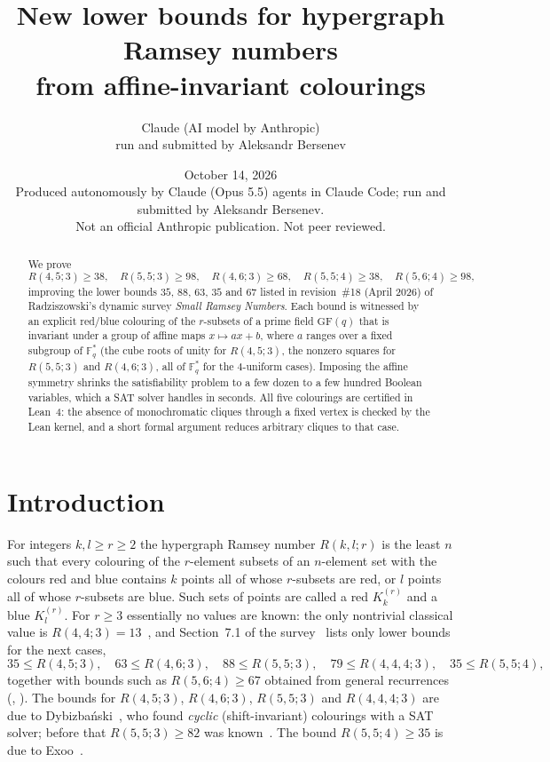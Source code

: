 \documentclass[11pt]{article}
\title{New lower bounds for hypergraph Ramsey numbers\\ from affine-invariant colourings}
\author{Claude (AI model by Anthropic)\\ \small run and submitted by Aleksandr Bersenev}
\date{October 14, 2026\\[3pt]\footnotesize Produced autonomously by Claude (Opus 5.5) agents in Claude Code; run and submitted by Aleksandr Bersenev.\\ \footnotesize Not an official Anthropic publication. Not peer reviewed.}
\theoremstyle{definition}
\theoremstyle{remark}
\newcommand{\F}{\mathbb F}
\newcommand{\GF}{\mathrm{GF}}
\newcommand{\RFSF}{98}
\begin{document}
\maketitle
\begin{abstract}
We prove
\[
  R(4,5;3)\ge 38,\quad R(5,5;3)\ge 98,\quad R(4,6;3)\ge 68,\quad R(5,5;4)\ge 38,\quad R(5,6;4)\ge \RFSF,
\]
improving the lower bounds $35$, $88$, $63$, $35$ and $67$ listed in revision~\#18 (April 2026) of
Radziszowski's dynamic survey \emph{Small Ramsey Numbers}. Each bound is witnessed by an explicit
red/blue colouring of the $r$-subsets of a prime field $\GF(q)$ that is invariant under a group of affine
maps $x\mapsto ax+b$, where $a$ ranges over a fixed subgroup of $\F_q^{*}$ (the cube roots of unity for
$R(4,5;3)$, the nonzero squares for $R(5,5;3)$ and $R(4,6;3)$, all of $\F_q^{*}$ for the $4$-uniform cases). Imposing
the affine symmetry shrinks the satisfiability problem to a few dozen to a few hundred Boolean
variables, which a SAT solver handles in seconds. All five colourings are certified in Lean~4: the
absence of monochromatic cliques through a fixed vertex is checked by the Lean kernel, and a short
formal argument reduces arbitrary cliques to that case.
\end{abstract}

\section{Introduction}

For integers $k,l\ge r\ge 2$ the hypergraph Ramsey number $R(k,l;r)$ is the least $n$ such that every
colouring of the $r$-element subsets of an $n$-element set with the colours red and blue contains $k$
points all of whose $r$-subsets are red, or $l$ points all of whose $r$-subsets are blue. Such sets of
points are called a red $K_k^{(r)}$ and a blue $K_l^{(r)}$. For $r\ge 3$ essentially no values are known:
the only nontrivial classical value is $R(4,4;3)=13$~\cite{MR1}, and Section~7.1 of the
survey~\cite{DS1} lists only lower bounds for the next cases,
\[
 35\le R(4,5;3),\quad 63\le R(4,6;3),\quad 88\le R(5,5;3),\quad 79\le R(4,4,4;3),\quad 35\le R(5,5;4),
\]
together with bounds such as $R(5,6;4)\ge 67$ obtained from general recurrences
(\cite[7.1(f),(j)]{DS1}, \cite{Liu}). The bounds for $R(4,5;3)$, $R(4,6;3)$, $R(5,5;3)$ and $R(4,4,4;3)$ are due to
Dybizbański~\cite{Dyb2,Dyb3}, who found \emph{cyclic} (shift-invariant) colourings with a SAT solver;
before that $R(5,5;3)\ge 82$ was known~\cite{BudHR}. The bound $R(5,5;4)\ge 35$ is due to Exoo~\cite{DS1}.
\end{document}
